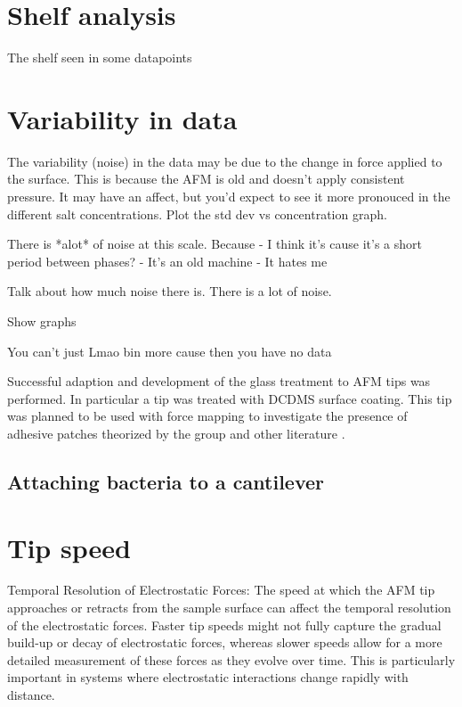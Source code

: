 \section{Shelf analysis}

The shelf seen in some datapoints 

\section{Variability in data}

The variability (noise) in the data may be due to the change in force applied to the surface. This is because the AFM is old and doesn't apply consistent pressure. It may have an affect, but you'd expect to see it more pronouced in the different salt concentrations. Plot the std dev vs concentration graph.

There is *alot* of noise at this scale. Because 
- I think it's cause it's a short period between phases?
- It's an old machine
- It hates me

Talk about how much noise there is. There is a lot of noise.

Show graphs

You can't just Lmao bin more cause then you have no data




Successful adaption and development of the glass treatment to AFM tips was performed. In particular a tip was treated with DCDMS surface coating. This tip was planned to be used with force mapping to investigate the presence of adhesive patches theorized by the group \cite{Teun1} and other literature \cite{Patchy}. 

\subsection{Attaching bacteria to a cantilever}
\newpage

\section{Tip speed}
Temporal Resolution of Electrostatic Forces: The speed at which the AFM tip approaches or retracts from the sample surface can affect the temporal resolution of the electrostatic forces. Faster tip speeds might not fully capture the gradual build-up or decay of electrostatic forces, whereas slower speeds allow for a more detailed measurement of these forces as they evolve over time. This is particularly important in systems where electrostatic interactions change rapidly with distance.

